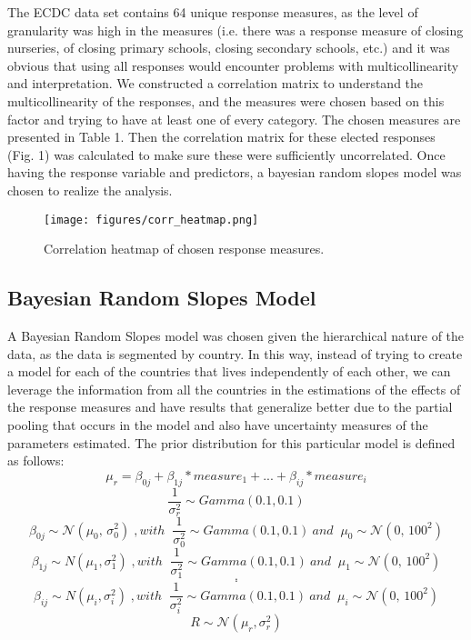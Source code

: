 \documentclass{article}
\begin{document}
The ECDC data set contains 64 unique response measures, as the level of granularity was high in the measures (i.e. there was a response measure of closing nurseries, of closing primary schools, closing secondary schools, etc.) and it was obvious that using all responses would encounter problems with multicollinearity and interpretation. We constructed a correlation matrix to understand the multicollinearity of the responses, and the measures were chosen based on this factor and trying to have at least one of every category. The chosen measures are presented in Table 1. Then the correlation matrix for these elected responses (Fig. 1) was calculated to make sure these were sufficiently uncorrelated. Once having the response variable and predictors, a bayesian random slopes model was chosen to realize the analysis.

\begin{figure}[H]
    \centering
    \texttt{[image: figures/corr\_heatmap.png]}%
    \caption{Correlation heatmap of chosen response measures.}
    \label{fig:heatmap}
\end{figure}

\subsection{Bayesian Random Slopes Model}
A Bayesian Random Slopes model was chosen given the hierarchical nature of the data, as the data is segmented by country. In this way, instead of trying to create a model for each of the countries that lives independently of each other, we can leverage the information from all the countries in the estimations of the effects of the response measures and have results that generalize better due to the partial pooling that occurs in the model and also have uncertainty measures of the parameters estimated. The prior distribution for this particular model is defined as follows: 
$$\mu_r=\beta_{0j}+\beta_{1j}*measure_1+...+\beta_{ij}*measure_i$$
$$\frac{1}{\sigma_r^2} \sim {Gamma}(0.1,0.1)$$
$$\beta_{0j}\sim  \mathcal{N}(\mu_0,\,\sigma_0^{2})\; {, with} \;\; \frac{1}{\sigma^2_0} \sim {Gamma}(0.1,0.1)\ {and} \;\; \mu_0 \sim \mathcal{N}(0,\,100^2)$$
$$\beta_{1j} \sim N(\mu_1,\sigma_1^2)\; {, with} \;\; \frac{1}{\sigma^2_1} \sim {Gamma}(0.1,0.1)\ {and} \;\; \mu_1 \sim \mathcal{N}(0,\,100^2)$$
$$.$$
$$.$$
$$\beta_{ij} \sim N(\mu_i,\sigma_i^2)\; {, with} \;\; \frac{1}{\sigma^2_i} \sim {Gamma}(0.1,0.1)\ {and} \;\; \mu_i \sim \mathcal{N}(0,\,100^2)$$
$$R \sim \mathcal{N}(\mu_r, \sigma_r^2)$$
\end{document}
